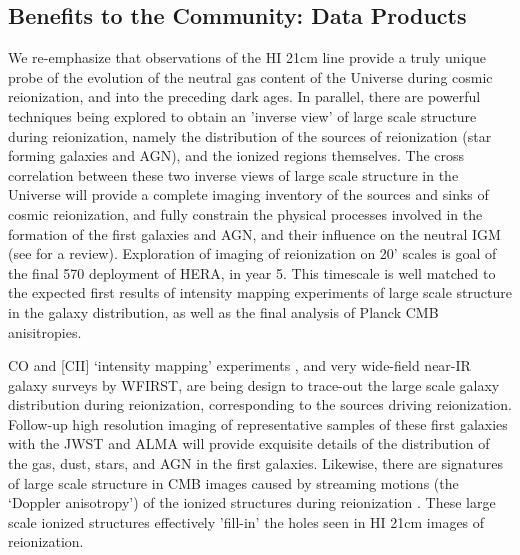 \documentclass[preprint]{aastex}
\begin{document}
%
%

\subsection{Benefits to the Community: Data Products}

We re-emphasize that observations of the HI 21cm line provide a truly unique
probe of the evolution of the neutral gas content of the Universe during cosmic
reionization, and into the preceding dark ages. In parallel, there are powerful
techniques being explored to obtain an 'inverse view' of large scale structure
during reionization, namely the distribution of the sources of reionization
(star forming galaxies and AGN), and the ionized regions themselves.  The cross
correlation between these two inverse views of large scale structure in the
Universe will provide a complete imaging inventory of the sources and sinks of
cosmic reionization, and fully constrain the physical processes involved in the
formation of the first galaxies and AGN, and their influence on the neutral IGM
(see \citealt{pritchard_loeb2012} for a review).  Exploration of imaging of
reionization on 20' scales is goal of the final 570 deployment of HERA, in year
5. This timescale is well matched to the expected first results of intensity
mapping experiments of large scale structure in the galaxy distribution, as
well as the final analysis of Planck  CMB anisitropies. 

CO and [CII] `intensity mapping' experiments \citep{carilli2011,lidz_et_al2011,gong_et_al2011}, 
and very wide-field
near-IR galaxy surveys by WFIRST, are being design to trace-out the large
scale galaxy distribution during reionization, corresponding to the sources
driving reionization. Follow-up high resolution imaging of representative
samples of these first galaxies with the JWST and ALMA will provide exquisite
details of the distribution of the gas, dust, stars, and AGN in the first
galaxies. Likewise, there are signatures of large scale structure in CMB images
caused by streaming motions (the `Doppler anisotropy') of the ionized
structures during reionization \citep{alvarez_et_al2006,tashiro_et_al2010}. These large scale ionized structures
effectively 'fill-in' the holes seen in HI 21cm images of reionization. 
\end{document}
